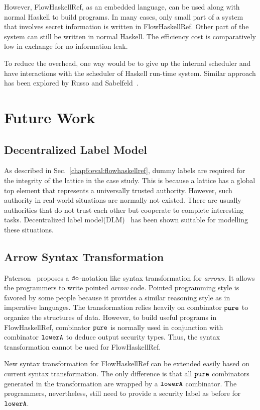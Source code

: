 \documentclass{report}
\newcommand{\co}[1]{$\cod{#1}$}
\begin{document}
However, FlowHaskellRef, as an embedded language, can be used along with normal Haskell to build programs.
In many cases, only small part of a system that involves secret information is 
written in FlowHaskellRef. Other part of the system can still be written in normal Haskell. 
The efficiency cost is comparatively low in exchange for no information leak.

To reduce the overhead, one way would be to give up the internal scheduler and have interactions with the scheduler 
of Haskell run-time system. Similar approach has been explored by Russo and Sabelfeld~\cite{Russo:Sabelfeld:CSFW06}.

\section{Future Work}
\subsection{Decentralized Label Model}
As described in Sec.~\ref{chap6:eval:flowhaskellref}, dummy labels are required for the integrity
of the lattice in the case study. This is because a lattice has a global top element that
represents a universally trusted authority. However, such authority in real-world situations are normally 
not existed. There are usually authorities that do not trust each other but cooperate to complete
interesting tasks. Decentralized label model(DLM)~\cite{Myers:Liskov:TSEM2000} has been shown suitable for
modelling these situations.

\subsection{Arrow Syntax Transformation}
Paterson~\cite{Paterson:ICFP01} proposes a \co{do}-notation like syntax transformation
for {\em arrows}. It allows the programmers to write pointed {\em arrow} code. 
Pointed programming style is favored by some people because it provides a similar
reasoning style as in imperative languages.
The transformation relies heavily on combinator \co{pure} to organize the structures of data. 
However, to build useful programs in FlowHaskellRef, combinator \co{pure} is normally used in 
conjunction with combinator \co{lowerA} to deduce output security types. Thus, the syntax transformation 
cannot be used for FlowHaskellRef. 

New syntax transformation for FlowHaskellRef can be extended easily based on current syntax transformation.
The only difference is that all \co{pure} combinators generated in the transformation are wrapped by a \co{lowerA} 
combinator. The programmers, nevertheless, still need to provide a security label as before for \co{lowerA}.
\end{document}
